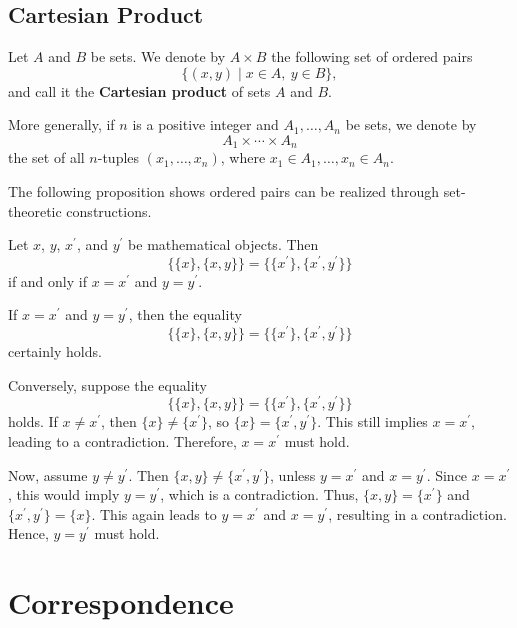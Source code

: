 \documentclass{book}
\numberwithin{equation}{section}
\begin{document}
\section{Cartesian Product}

\begin{definitionenv}
Let \(A\) and \(B\) be sets. We denote by \(A \times B\) the following set of ordered pairs
\[
\{(x,  y) \mid x \in A, \ y \in B\}, 
\]
and call it the \textbf{Cartesian product} of sets \(A\) and \(B\).

More generally,  if \(n\) is a positive integer and \(A_1,  \ldots,  A_n\) be sets,  we denote by
\[
A_1 \times \cdots \times A_n
\]
the set of all \(n\)-tuples \((x_1,  \ldots,  x_n)\),  where \(x_1 \in A_1,  \ldots,  x_n \in A_n\).
\end{definitionenv}

The following proposition shows ordered pairs can be realized through set-theoretic constructions.

\begin{propositionenv}
Let \(x\),  \(y\),  \(x^{\prime}\),  and \(y^{\prime}\) be mathematical objects. Then
\[
\{\{x\}, \{x, y\}\}=\{\{x^{\prime}\}, \{x^{\prime}, y^{\prime}\}\}
\]
if and only if \(x=x^{\prime}\) and \(y=y^{\prime}\).
\end{propositionenv}

\begin{proofenv}
If \(x=x^{\prime}\) and \(y=y^{\prime}\),  then the equality
\[
\{\{x\}, \{x, y\}\}=\{\{x^{\prime}\}, \{x^{\prime}, y^{\prime}\}\}
\]
certainly holds.

Conversely,  suppose the equality
\[
\{\{x\}, \{x, y\}\}=\{\{x^{\prime}\}, \{x^{\prime}, y^{\prime}\}\}
\]
holds. If \(x\neq x^{\prime}\),  then \(\{x\}\neq\{x^{\prime}\}\),  so \(\{x\}=\{x^{\prime}, y^{\prime}\}\). This still implies \(x=x^{\prime}\),  leading to a contradiction. Therefore,  \(x=x^{\prime}\) must hold.

Now,  assume \(y\neq y^{\prime}\). Then \(\{x, y\}\neq\{x^{\prime}, y^{\prime}\}\),  unless \(y=x^{\prime}\) and \(x=y^{\prime}\). Since \(x=x^{\prime}\),  this would imply \(y=y^{\prime}\),  which is a contradiction. Thus,  \(\{x, y\}=\{x^{\prime}\}\) and \(\{x^{\prime}, y^{\prime}\}=\{x\}\). This again leads to \(y=x^{\prime}\) and \(x=y^{\prime}\),  resulting in a contradiction. Hence,  \(y=y^{\prime}\) must hold.
\end{proofenv}

\chapter{Correspondence}
\end{document}
